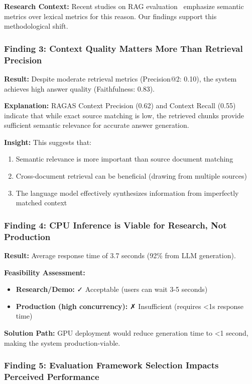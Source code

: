 \textbf{Research Context:} Recent studies on RAG evaluation~\cite{es2023ragas,chen2023benchmarking} emphasize semantic metrics over lexical metrics for this reason. Our findings support this methodological shift.

\subsubsection{Finding 3: Context Quality Matters More Than Retrieval Precision}

\textbf{Result:} Despite moderate retrieval metrics (Precision@2: 0.10), the system achieves high answer quality (Faithfulness: 0.83).

\textbf{Explanation:} RAGAS Context Precision (0.62) and Context Recall (0.55) indicate that while exact source matching is low, the retrieved chunks provide sufficient semantic relevance for accurate answer generation.

\textbf{Insight:} This suggests that:
\begin{enumerate}
    \item Semantic relevance is more important than source document matching
    \item Cross-document retrieval can be beneficial (drawing from multiple sources)
    \item The language model effectively synthesizes information from imperfectly matched context
\end{enumerate}

\subsubsection{Finding 4: CPU Inference is Viable for Research, Not Production}

\textbf{Result:} Average response time of 3.7 seconds (92\% from LLM generation).

\textbf{Feasibility Assessment:}
\begin{itemize}
    \item \textbf{Research/Demo:} ✓ Acceptable (users can wait 3-5 seconds)
    \item \textbf{Production (high concurrency):} ✗ Insufficient (requires <1s response time)
\end{itemize}

\textbf{Solution Path:} GPU deployment would reduce generation time to <1 second, making the system production-viable.

\subsubsection{Finding 5: Evaluation Framework Selection Impacts Perceived Performance}

